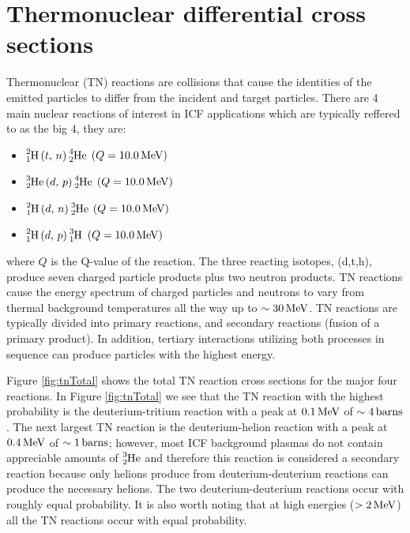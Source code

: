 \section{Thermonuclear differential cross sections}
Thermonuclear (TN) reactions are collisions that cause the identities of the emitted particles to differ from the incident and target particles. There are 4 main nuclear reactions of interest in ICF applications which are typically reffered to as the big 4, they are:
\begin{multicols}{2}
\begin{itemize}
    \item $\ce{^{2}_{1}H} \, (t, \, n)\, \ce{^{4}_{2}He}$  $(Q = 10.0 \,\text{MeV})$
    \item $\ce{^{3}_{2}He}\, (d, \, p)\, \ce{^{4}_{2}He}$  $(Q = 10.0 \,\text{MeV})$
    \item $\ce{^{2}_{1}H} \, (d, \, n)\, \ce{^{3}_{2}He}$  $(Q = 10.0 \,\text{MeV})$
    \item $\ce{^{2}_{1}H} \, (d, \, p)\, \ce{^{3}_{1}H}$   $(Q = 10.0 \,\text{MeV})$
\end{itemize}
\end{multicols}
where $Q$ is the Q-value of the reaction. The three reacting isotopes, (d,t,h), produce seven charged particle products plus two neutron products. TN reactions cause the energy spectrum of charged particles and neutrons to vary from thermal background temperatures all the way up to $\sim 30 \,\text{MeV}$. TN reactions are typically divided into primary reactions, and secondary reactions (fusion of a primary product). In addition, tertiary interactions utilizing both processes in sequence can produce particles with the highest energy.  

Figure \ref{fig:tnTotal} shows the total TN reaction cross sections for the major four reactions. In Figure \ref{fig:tnTotal} we see that the TN reaction with the highest probability is the deuterium-tritium reaction with a peak at $0.1 \,\text{MeV}$ of $\sim 4 \,\text{barns}$. The next largest TN reaction is the deuterium-helion reaction with a peak at $0.4 \,\text{MeV}$ of $\sim 1 \,\text{barns}$; however, most ICF background plasmas do not contain appreciable amounts of $\ce{^{3}_{2}He}$ and therefore this reaction is considered a secondary reaction because only helions produce from deuterium-deuterium reactions can produce the necessary helions. The two deuterium-deuterium reactions occur with roughly equal probability. It is also worth noting that at high energies ($> 2 \,\text{MeV}$) all the TN reactions occur with equal probability.

